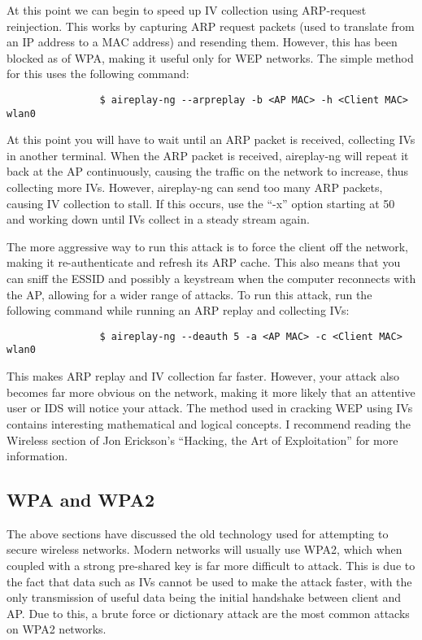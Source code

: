 			At this point we can begin to speed up IV collection using ARP-request reinjection.
			This works by capturing ARP request packets (used to translate from an IP address to a MAC address) and resending them.
			However, this has been blocked as of WPA, making it useful only for WEP networks.
			The simple method for this uses the following command:
			\begin{verbatim}
				$ aireplay-ng --arpreplay -b <AP MAC> -h <Client MAC> wlan0
			\end{verbatim}
			At this point you will have to wait until an ARP packet is received, collecting IVs in another terminal.
			When the ARP packet is received, aireplay-ng will repeat it back at the AP continuously, causing the traffic on the network to increase, thus collecting more IVs.
			However, aireplay-ng can send too many ARP packets, causing IV collection to stall.
			If this occurs, use the ``-x'' option starting at 50 and working down until IVs collect in a steady stream again.

			The more aggressive way to run this attack is to force the client off the network, making it re-authenticate and refresh its ARP cache.
			This also means that you can sniff the ESSID and possibly a keystream when the computer reconnects with the AP, allowing for a wider range of attacks.
			To run this attack, run the following command while running an ARP replay and collecting IVs:
			\begin{verbatim}
				$ aireplay-ng --deauth 5 -a <AP MAC> -c <Client MAC> wlan0
			\end{verbatim}
			This makes ARP replay and IV collection far faster.
			However, your attack also becomes far more obvious on the network, making it more likely that an attentive user or IDS will notice your attack.
			The method used in cracking WEP using IVs contains interesting mathematical and logical concepts.
			I recommend reading the Wireless section of Jon Erickson's ``Hacking, the Art of Exploitation''\cite{HackingAOE} for more information.

		\subsection{WPA and WPA2}
			The above sections have discussed the old technology used for attempting to secure wireless networks.
			Modern networks will usually use WPA2, which when coupled with a strong pre-shared key is far more difficult to attack.
			This is due to the fact that data such as IVs cannot be used to make the attack faster, with the only transmission of useful data being the initial handshake between client and AP.
			Due to this, a brute force or dictionary attack are the most common attacks on WPA2 networks.

